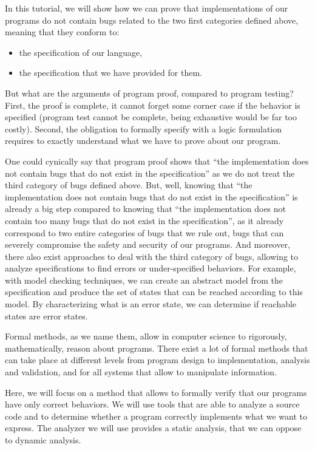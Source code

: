 In this tutorial, we will show how we can prove that implementations
of our programs do not contain bugs related to the two first categories
defined above, meaning that they conform to:
\begin{itemize}
\item the specification of our language,
\item the specification that we have provided for them.
\end{itemize}


But what are the arguments of program
proof, compared to program testing? First, the proof is complete, it
cannot forget some corner case if the behavior is specified (program
test cannot be complete, being exhaustive would be far too costly).
Second, the obligation to formally specify with a logic formulation
requires to exactly understand what we have to prove about our program.



One could cynically say that program proof shows that ``the
implementation does not contain bugs that do not exist in the
specification'' as we do not treat the third category of bugs defined
above. But, well, knowing that ``the implementation does not contain bugs
that do not exist in the specification'' is already a big step compared to
knowing that ``the implementation does not contain too many bugs that do
not exist in the specification'', as it already correspond to two entire
categories of bugs that we rule out, bugs that can severely compromise the
safety and security of our programs. And moreover, there also exist approaches
to deal with the third category of bugs, allowing to analyze specifications
to find errors or under-specified behaviors. For
example, with model checking techniques, we can create an abstract model
from the specification and produce the set of states that can be reached
according to this model. By characterizing what is an error state, we
can determine if reachable states are error states.





Formal methods, as we name them, allow in computer science to
rigorously, mathematically, reason about programs. There exist a lot of
formal methods that can take place at different levels from program
design to implementation, analysis and validation, and for all systems
that allow to manipulate information.



Here, we will focus on a method that allows to formally verify that our
programs have only correct behaviors. We will use tools that are able to
analyze a source code and to determine whether a program correctly
implements what we want to express. The analyzer we will use provides a
static analysis, that we can oppose to dynamic analysis.



